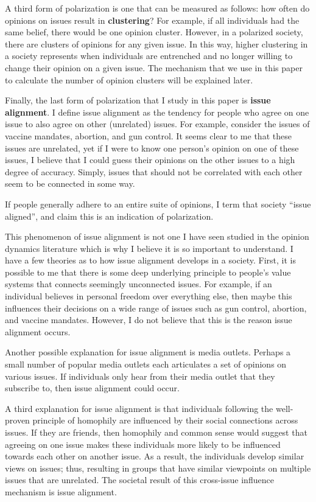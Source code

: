 A third form of polarization is one that can be measured as follows:
how often do opinions on issues result in \textbf{clustering}? For
example, if all individuals had the same belief, there would be one opinion
cluster. However, in a polarized society, there are clusters of opinions for any given issue. In this way, higher clustering in a society represents when individuals are entrenched and no longer willing to change their opinion on a given issue. The mechanism that we use in this paper to calculate the number of opinion clusters will be explained later.

Finally, the last form of polarization that I study in this paper is \textbf{issue alignment}. I define issue alignment as the tendency for people who agree on one issue to also agree on other (unrelated) issues. For example, consider the issues of vaccine mandates, abortion, and gun control. It seems clear to me that these issues are unrelated, yet if I were to know one person's opinion on one of these issues, I believe that I could guess their opinions on the other issues to a high degree of accuracy. Simply, issues that should not be correlated with each other seem to be connected in some way. 

If people generally adhere to an entire suite of opinions, I term that society ``issue aligned'', and claim this is an indication of polarization. 

This phenomenon of issue alignment is not one I have seen studied in the opinion dynamics literature which is why I believe it is so important to understand. I have a few theories as to how issue alignment develops in a society. First, it is possible to me that there is some deep underlying principle to people's value systems that connects seemingly unconnected issues. For example, if an individual believes in personal freedom over everything else, then maybe this influences their decisions on a wide range of issues such as gun control, abortion, and vaccine mandates. However, I do not believe that this is the reason issue alignment occurs. 

Another possible explanation for issue alignment is media outlets. Perhaps a small number of popular media outlets each articulates a set of opinions on various issues. If individuals only hear from their media outlet that they subscribe to, then issue alignment could occur.

A third explanation for issue alignment is that individuals following the well-proven principle of homophily are influenced by their social connections across issues. If they are friends, then homophily and common sense would suggest that agreeing on one issue makes these individuals more likely to be influenced towards each other on another issue. As a result, the individuals develop similar views on issues; thus, resulting in groups that have similar viewpoints on multiple issues that are unrelated. The societal result of this cross-issue influence mechanism is issue alignment.   

